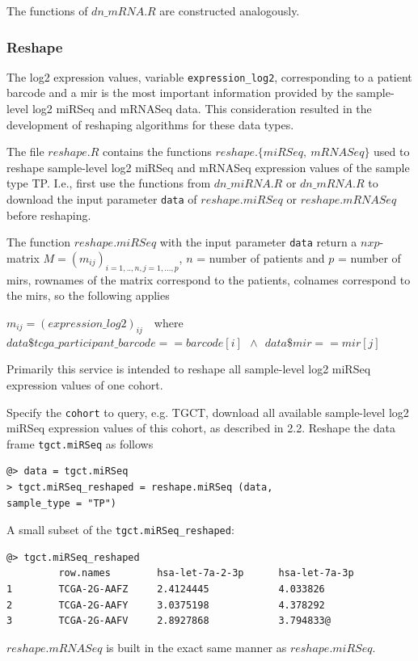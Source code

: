 \documentclass{TechReport}
\begin{document}
The functions of $dn\_mRNA.R$ are constructed analogously.


\subsubsection{Reshape}
The log2 expression values, variable {\tt expression\_log2}, corresponding to a
patient barcode and a mir is the most important information provided by 
the sample-level log2 miRSeq and mRNASeq data. This consideration resulted in the
development of reshaping algorithms for these data types.

The file $reshape.R$ contains the functions $reshape.\{miRSeq,\ mRNASeq\}$
used to reshape sample-level log2 miRSeq and mRNASeq 
expression values of the sample type TP. I.e., first use the functions from 
$dn\_miRNA.R$ or $dn\_mRNA.R$ to download the input parameter {\tt data}
of $reshape.miRSeq$ or $reshape.mRNASeq$ before reshaping. 

The function $reshape.miRSeq$ with the input parameter {\tt data} return a
$nxp$-matrix $M = (m_{ij})_{i=1,..,n, j=1,...,p}$, $n$ = number of patients and 
$p$ = number of mirs, rownames of the matrix correspond to the patients, colnames
correspond to the mirs,  so the following applies
\begin{center}
$m_{ij}= (expression\_log2)_{ij}$\ \  where \\
$data\$tcga\_participant\_barcode==barcode[i]\ \  \wedge\ \ data\$mir==mir[j] $
\end{center}
Primarily this service is intended to reshape all sample-level log2 miRSeq
expression values of one cohort. 

Specify the {\tt cohort} to query, e.g. TGCT, download all available sample-level
log2 miRSeq expression values of this cohort, as described 
in 2.2.
Reshape the data frame {\tt tgct.miRSeq} as follows
\begin{lstlisting}[style=base]
@> data = tgct.miRSeq
> tgct.miRSeq_reshaped = reshape.miRSeq (data, 
sample_type = "TP")
\end{lstlisting}
A small subset of the {\tt tgct.miRSeq\_reshaped}:
\begin{lstlisting}[style=base]
@> tgct.miRSeq_reshaped
         row.names        hsa-let-7a-2-3p      hsa-let-7a-3p
1        TCGA-2G-AAFZ     2.4124445            4.033826
2        TCGA-2G-AAFY     3.0375198            4.378292
3        TCGA-2G-AAFV     2.8927868            3.794833@
\end{lstlisting}
$reshape.mRNASeq$ is built in the exact same manner as $reshape.miRSeq$.
\end{document}
